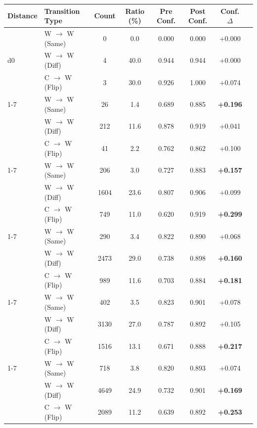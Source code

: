 
\begin{table}[t]
\centering
\small
\begin{tabular}{llcccccc}
\toprule
Distance & Transition Type & Count & Ratio (\%) & Pre Conf. & Post Conf. & Conf. $\Delta$ \\
\midrule
\multirow{3}{*}{d0} 
& W $\to$ W (Same) & 0 & 0.0 & 0.000 & 0.000 & +0.000 \\
& W $\to$ W (Diff) & 4 & 40.0 & 0.944 & 0.944 & +0.000 \\
& C $\to$ W (Flip) & 3 & 30.0 & 0.926 & 1.000 & +0.074 \\
\cmidrule(lr){1-7}
\multirow{3}{*}{d1} 
& W $\to$ W (Same) & 26 & 1.4 & 0.689 & 0.885 & \textbf{+0.196} \\
& W $\to$ W (Diff) & 212 & 11.6 & 0.878 & 0.919 & +0.041 \\
& C $\to$ W (Flip) & 41 & 2.2 & 0.762 & 0.862 & +0.100 \\
\cmidrule(lr){1-7}
\multirow{3}{*}{d2} 
& W $\to$ W (Same) & 206 & 3.0 & 0.727 & 0.883 & \textbf{+0.157} \\
& W $\to$ W (Diff) & 1604 & 23.6 & 0.807 & 0.906 & +0.099 \\
& C $\to$ W (Flip) & 749 & 11.0 & 0.620 & 0.919 & \textbf{+0.299} \\
\cmidrule(lr){1-7}
\multirow{3}{*}{d3} 
& W $\to$ W (Same) & 290 & 3.4 & 0.822 & 0.890 & +0.068 \\
& W $\to$ W (Diff) & 2473 & 29.0 & 0.738 & 0.898 & \textbf{+0.160} \\
& C $\to$ W (Flip) & 989 & 11.6 & 0.703 & 0.884 & \textbf{+0.181} \\
\cmidrule(lr){1-7}
\multirow{3}{*}{d4} 
& W $\to$ W (Same) & 402 & 3.5 & 0.823 & 0.901 & +0.078 \\
& W $\to$ W (Diff) & 3130 & 27.0 & 0.787 & 0.892 & +0.105 \\
& C $\to$ W (Flip) & 1516 & 13.1 & 0.671 & 0.888 & \textbf{+0.217} \\
\cmidrule(lr){1-7}
\multirow{3}{*}{d5} 
& W $\to$ W (Same) & 718 & 3.8 & 0.820 & 0.893 & +0.074 \\
& W $\to$ W (Diff) & 4649 & 24.9 & 0.732 & 0.901 & \textbf{+0.169} \\
& C $\to$ W (Flip) & 2089 & 11.2 & 0.639 & 0.892 & \textbf{+0.253} \\

\end{tabular}
\end{table}
